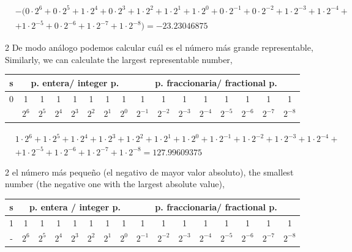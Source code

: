 \begin{equation*}
\begin{split}
&-(0\cdot 2^6+0 \cdot 2^5+ 1\cdot 2^4+ 0 \cdot 2^3+ 1 \cdot 2^2 + 1 \cdot 2^1 + 1 \cdot 2^0 + 0 \cdot 2^{-1}+ 0 \cdot 2^{-2}+ 1 \cdot 2^{-3}+ 1 \cdot 2^{-4}+ \\
& +1 \cdot 2^{-5}+0 \cdot 2^{-6} +1 \cdot 2^{-7}+1 \cdot 2^{-8}) = - 23.23046875
\end{split}
\end{equation*}

\begin{paracol}{2}
De modo análogo podemos calcular cuál es el número más grande representable,
\switchcolumn
Similarly, we can calculate the largest representable number,
\end{paracol}

\begin{center}
\begin{tabular}{|c||c|c|c|c|c|c|c||c|c|c|c|c|c|c|c|}
\hline
s&\multicolumn{7}{c||}{p. entera/ integer p.}&\multicolumn{8}{c|}{p. fraccionaria/ fractional p.}\\
\hline
0&1&1&1&1&1&1&1&1&1&1&1&1&1&1&1\\
\hline
&$2^{6}$&$2^{5}$&$2^{4}$&$2^{3}$&$2^{2}$&$2^{1}$&$2^{0}$&$2^{-1}$&$2^{-2}$&$2^{-3}$&$2^{-4}$&$2^{-5}$&$2^{-6}$&$2^{-7}$&$2^{-8}$\\
\hline
\end{tabular}
\end{center}

\begin{equation*}
\begin{split}
&1\cdot 2^6+1 \cdot 2^5+ 1\cdot 2^4+ 1 \cdot 2^3+ 1 \cdot 2^2 + 1 \cdot 2^1 + 1 \cdot 2^0 + 1 \cdot 2^{-1}+ 1 \cdot 2^{-2}+ 1 \cdot 2^{-3}+ 1 \cdot 2^{-4}+ \\
&+1 \cdot 2^{-5}+1 \cdot 2^{-6} +1 \cdot 2^{-7}+ 1\cdot 2^{-8} =  127.99609375
\end{split}
\end{equation*}

\begin{paracol}{2}
el número más pequeño (el negativo de mayor valor absoluto),
\switchcolumn
the smallest number (the negative one with the largest absolute value),
\end{paracol}

\begin{center}
\begin{tabular}{|c||c|c|c|c|c|c|c||c|c|c|c|c|c|c|c|}
\hline
s&\multicolumn{7}{c||}{p. entera / integer p.}&\multicolumn{8}{c|}{p. fraccionaria/ fractional p.}\\
\hline
1&1&1&1&1&1&1&1&1&1&1&1&1&1&1&1\\
\hline
-&$2^{6}$&$2^{5}$&$2^{4}$&$2^{3}$&$2^{2}$&$2^{1}$&$2^{0}$&$2^{-1}$&$2^{-2}$&$2^{-3}$&$2^{-4}$&$2^{-5}$&$2^{-6}$&$2^{-7}$&$2^{-8}$\\
\hline
\end{tabular}
\end{center}

